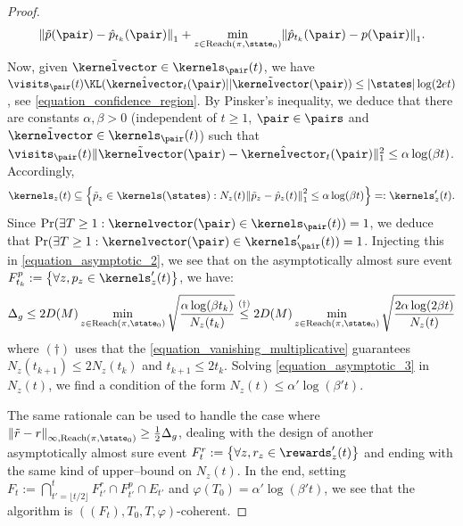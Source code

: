 \documentclass[preprint,cleveref,12pt]{colt2025}
\DeclarePairedDelimiter{\braces}{\{}{\}}	%
\DeclarePairedDelimiter{\abs}{\lvert}{\rvert}	%
\DeclarePairedDelimiter{\norm}{\lVert}{\rVert}	%
\def\kernel{\kernelvector}
\def\Reach{\mathrm{Reach}}
\begin{document}
\begin{proof}
\begin{equation}
\begin{split}
{                \norm*{\tilde{p}(\pair) - \hat{p}_{t_k}(\pair)}_{1}
                +
                \min_{z \in \Reach(\pi, \state_0)}
                \norm*{\hat{p}_{t_k}(\pair) - p(\pair)}_{1}
            }
            .
        \end{split}
        \end{equation}
        Now, given $\tilde{\kernel} \in \kernels_\pair (t)$, we have $\visits_\pair (t) \KL(\hat{\kernel}_{t}(\pair)||\tilde{\kernel}(\pair)) \le \abs{\states} \log(2et)$, see \eqref{equation_confidence_region}.
        By Pinsker's inequality, we deduce that there are constants $\alpha, \beta > 0$ (independent of $t \ge 1$, $\pair \in \pairs$ and $\tilde{\kernel} \in \kernels_\pair (t)$) such that $\visits_\pair (t) \norm{\tilde{\kernel}(\pair) - \hat{\kernel}_{t}(\pair)}_1^2 \le \alpha \log(\beta t)$. 
        Accordingly,
        \begin{equation*}
            \kernels_z(t) 
            \subseteq 
            \braces*{
                \tilde{p}_z \in \kernels(\states):
                N_z(t) \norm*{\tilde{p}_z - \hat{p}_z(t)}_1^2 \le \alpha \log(\beta t)
            }
            =: \kernels'_z(t)
            .
        \end{equation*}
        Since $\Pr(\exists T \ge 1: \kernel(\pair) \in \kernels_\pair(t)) = 1$, we deduce that $\Pr(\exists T \ge 1: \kernel(\pair) \in \kernels'_\pair(t)) = 1$.
        Injecting this in \eqref{equation_asymptotic_2}, we see that on the asymptotically almost sure event $F_{t_k}^p := \braces*{\forall z, p_z \in \kernels'_z(t)}$, we have:
        \begin{equation}
        \label{equation_asymptotic_3}
            \Delta_g 
            \le 
            2 D(M) 
            \min_{z \in \Reach(\pi, \state_0)}
            \sqrt{\frac{\alpha\log(\beta t_k)}{N_z(t_k)}}
            \overset{(\dagger)}\le
            2 D(M) 
            \min_{z \in \Reach(\pi, \state_0)}
            \sqrt{\frac{2\alpha\log(2\beta t)}{N_z(t)}}
        \end{equation}
        where $(\dagger)$ uses that the \eqref{equation_vanishing_multiplicative} guarantees $N_z(t_{k+1}) \le 2 N_z(t_k)$ and $t_{k+1} \le 2 t_k$.
        Solving \eqref{equation_asymptotic_3} in $N_z(t)$, we find a condition of the form $N_z(t) \le \alpha' \log(\beta' t)$.

        The same rationale can be used to handle the case where $\norm*{\tilde{r} - r}_{\infty, \Reach(\pi, \state_0)} \ge \tfrac 12 \Delta_g$, dealing with the design of another asymptotically almost sure event $F_t^r := \braces*{\forall z, r_z \in \rewards_z'(t)}$ and ending with the same kind of upper--bound on $N_z(t)$.
        In the end, setting $F_t := \bigcap_{t'=\lfloor t/2\rfloor}^t F_{t'}^r \cap F_{t'}^p \cap E_{t'}$ and $\varphi(T_0) = \alpha' \log(\beta' t)$, we see that the algorithm is $((F_t), T_0, T, \varphi)$-coherent.
    \end{proof}
\end{document}
